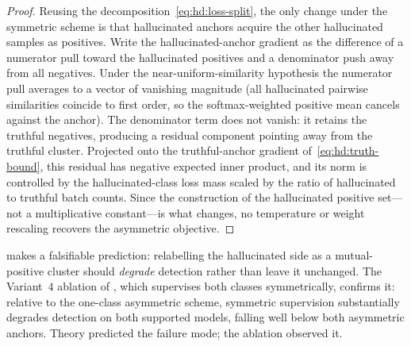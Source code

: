 \begin{proof}
Reusing the decomposition~\eqref{eq:hd:loss-split}, the only change under the
symmetric scheme is that hallucinated anchors acquire the other hallucinated
samples as positives. Write the hallucinated-anchor gradient as the difference of
a numerator pull toward the hallucinated positives and a denominator push away
from all negatives. Under the near-uniform-similarity hypothesis the numerator
pull averages to a vector of vanishing magnitude (all hallucinated pairwise
similarities coincide to first order, so the softmax-weighted positive mean
cancels against the anchor). The denominator term does not vanish: it retains the
truthful negatives, producing a residual component pointing away from the
truthful cluster. Projected onto the truthful-anchor gradient
of~\eqref{eq:hd:truth-bound}, this residual has negative expected inner product,
and its norm is controlled by the hallucinated-class loss mass scaled by the
ratio of hallucinated to truthful batch counts. Since the construction of the
hallucinated positive set---not a multiplicative constant---is what changes, no
temperature or weight rescaling recovers the asymmetric objective.
\end{proof}

\begin{remark}
 makes a falsifiable prediction: relabelling the hallucinated
side as a mutual-positive cluster should \emph{degrade} detection rather than
leave it unchanged. The Variant~$4$ ablation of , which
supervises both classes symmetrically, confirms it: relative to the one-class
asymmetric scheme, symmetric supervision substantially degrades detection on both
supported models, falling well below both asymmetric anchors.
Theory predicted the failure mode; the ablation observed it.
\end{remark}
